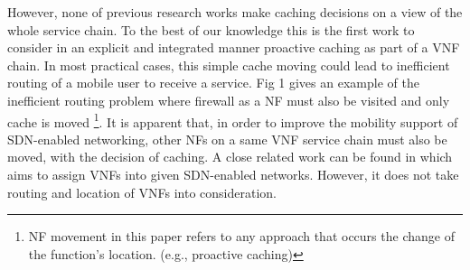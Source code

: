 \documentclass[journal]{IEEEtran}
\begin{document}
However, none of previous research works make caching decisions on a view of the whole service chain. To the best of our knowledge this is the first work to consider in an explicit and integrated manner proactive caching as part of a VNF chain. In most practical cases, this simple cache moving could lead to inefficient routing of a mobile user to receive a service. Fig 1 gives an example of the inefficient routing problem where firewall as a NF must also be visited and only cache is moved \footnote{NF movement in this paper refers to any approach that occurs the change of the function's location. (e.g., proactive caching)}. It is apparent that, in order to improve the mobility support of SDN-enabled networking, other NFs on a same VNF service chain must also be moved, with the decision of caching. A close related work can be found  in \cite{specifying and placing chains of virtual network functions} which aims to assign VNFs into given SDN-enabled networks. However, it does not take routing and location of VNFs into consideration.










\end{document}
